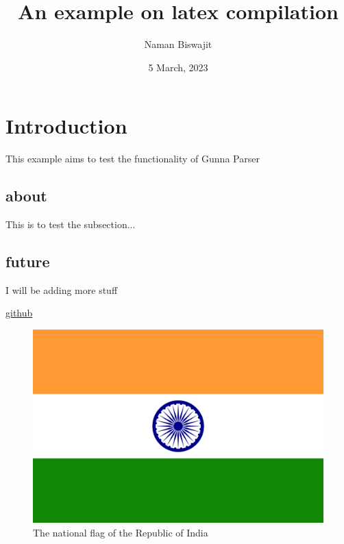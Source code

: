 \documentclass{article}
\title{An example on latex compilation}
\author{Naman Biswajit}
\date{5 March, 2023}
\begin{document}
\maketitle




\section{Introduction}
This example aims to test the functionality of Gunna Parser

\subsection{about}
This is to test the subsection...

\subsection{future}
I will be adding more stuff

\href{https://github.com/}{github}

\begin{figure}
\includegraphics[scale=2]{flag.png}
\caption{ The national flag of the Republic of India}
\end{figure}
\end{document}
